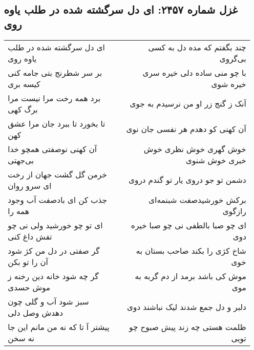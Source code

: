 \begin{center}
\section*{غزل شماره ۲۴۵۷: ای دل سرگشته شده در طلب یاوه روی}
\label{sec:2457}
\begin{longtable}{l p{0.5cm} r}
ای دل سرگشته شده در طلب یاوه روی
&&
چند بگفتم که مده دل به کسی بی‌گروی
\\
بر سر شطرنج بتی جامه کنی کیسه بری
&&
با چو منی ساده دلی خیره سری خیره شوی
\\
برد همه رخت مرا نیست مرا برگ کهی
&&
آنک ز گنج زر او من نرسیدم به جوی
\\
تا بخورد تا ببرد جان مرا عشق کهن
&&
آن کهنی کو دهدم هر نفسی جان نوی
\\
آن کهنی نوصفتی همچو خدا بی‌جهتی
&&
خوش گهری خوش نظری خوش خبری خوش شنوی
\\
خرمن گل گشت جهان از رخت ای سرو روان
&&
دشمن تو جو دروی یار تو گندم دروی
\\
جذب کن ای بادصفت آب وجود همه را
&&
برکش خورشیدصفت شبنمه‌ای رازگوی
\\
ای تو چو خورشید ولی نی چو تفش داغ کنی
&&
ای چو صبا بالطفی نی چو صبا خیره دوی
\\
گر صفتی در دل من کژ شود آن را تو بکن
&&
شاخ کژی را بکند صاحب بستان به خوی
\\
گر چه شود خانه دین رخنه ز موش حسدی
&&
موش کی باشد برمد از دم گربه به موی
\\
سبز شود آب و گلی چون دهدش وصل دلی
&&
دلبر و دل جمع شدند لیک نباشند دوی
\\
پیشتر آ تا که نه من مانم این جا نه سخن
&&
ظلمت هستی چه زند پیش صبوح چو تویی
\\
\end{longtable}
\end{center}
